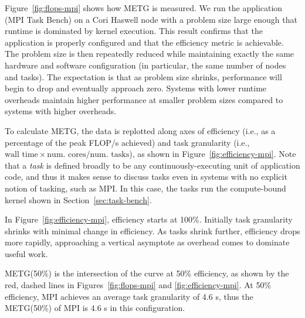 





Figure~\ref{fig:flops-mpi} shows how METG is
measured. We run the application (MPI Task Bench) on a Cori Haswell node
with a problem size large enough that runtime is dominated by kernel
execution. This result confirms
that the application is properly configured and that the
efficiency metric is achievable. The problem
size is then repeatedly reduced while maintaining exactly the same hardware and software
configuration (in particular, the same number of nodes and tasks). The
expectation is that as problem size shrinks,
performance will begin to drop and eventually approach zero. Systems
with lower runtime overheads maintain higher performance at smaller
problem sizes compared to systems with higher overheads.

To calculate METG, the data is replotted along axes of efficiency
(i.e., as a percentage of the peak FLOP/s achieved) and task
granularity (i.e., $\text{wall time} \times \text{num.~cores}/\text{num.~tasks}$), as shown in Figure~\ref{fig:efficiency-mpi}. Note that a \emph{task} is defined
broadly to be any continuously-executing unit of application code,
and thus it makes sense to discuss tasks even in systems
with no explicit notion of tasking, such as MPI. In this case, the
tasks run the compute-bound kernel shown in
Section~\ref{sec:task-bench}.

In Figure~\ref{fig:efficiency-mpi},
efficiency starts at 100\%. Initially task granularity
shrinks with minimal change in efficiency. As tasks shrink further, efficiency drops more rapidly, approaching a vertical asymptote as overhead comes to dominate useful work.


METG(50\%) is the intersection of the curve at 50\% efficiency, as
shown by the red, dashed lines in Figures~\ref{fig:flops-mpi} and
\ref{fig:efficiency-mpi}. At 50\% efficiency, MPI achieves an average
task granularity of
4.6 \textmu{}s, thus the METG(50\%) of MPI is 4.6 \textmu{}s in this
configuration. %

